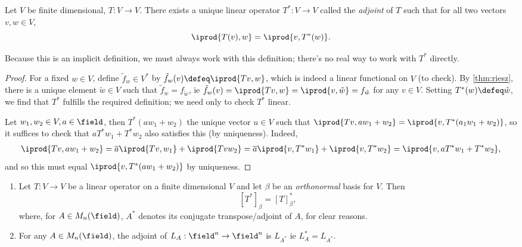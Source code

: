 \begin{theorem}[Adjoint]
    Let $V$ be finite dimensional, $T : V \to V$. There exists a unique linear operator $T^\ast : V \to V$ called the \emph{adjoint} of $T$ such that for all two vectors $v, w \in V$, \[
    \iprod{T(v), w} = \iprod{v, T^\ast(w)}.
    \]
\end{theorem}

\begin{remark}
    Because this is an implicit definition, we must always work with this definition; there's no real way to work with $T^\ast$ directly.
\end{remark}

\begin{proof}
    For a fixed $w \in V$, define $\tilde{f}_w \in V^\ast$ by $\tilde{f}_w(v) \defeq \iprod{Tv, w}$, which is indeed a linear functional on $V$ (to check). By \cref{thm:riesz}, there is a unique element $\tilde{w} \in V$ such that $\tilde{f}_w = f_{\tilde{w}}$, ie $\tilde{f}_w(v) = \iprod{Tv, w} = \iprod{v, \tilde{w}} = f_{\tilde{w}}$ for any $v \in V$. Setting $T^\ast(w) \defeq \tilde{w}$, we find that $T^\ast$ fulfills the required definition; we need only to check $T^\ast$ linear.

    Let $w_1, w_2 \in V, a \in \field$, then $T^\ast(aw_1 + w_2)$ the unique vector $u \in V$ such that $\iprod{Tv, aw_1 + w_2} = \iprod{v, T^\ast(a_1 w_1 + w_2)}$, so it suffices to check that $aT^\ast w_1 + T^\ast w_2$ also satisfies this (by uniqueness). Indeed, \begin{align*}
        \iprod{Tv, aw_1 + w_2} = \overline{a} \iprod{Tv, w_1} + \iprod{Tv w_2} = \overline{a} \iprod{v, T^\ast w_1} + \iprod{v, T^\ast w_2} = \iprod{v, aT^\ast w_1 + T^\ast w_2},
    \end{align*}
    and so this must equal $\iprod{v, T^\ast (aw_1 + w_2)}$ by uniqueness.
\end{proof}

\begin{proposition}
    \begin{enumerate}[label=(\alph*)]
        \item Let $T : V \to V$ be a linear operator on a finite dimensional $V$ and let $\beta$ be an \emph{orthonormal} basis for $V$. Then \[
        [T^\ast]_\beta = [T]_\beta^\ast,    
        \]
        where, for $A \in M_n(\field)$, $A^\ast$ denotes its conjugate transpose/adjoint of $A$, for clear reasons.
    \item For any $A \in M_n(\field)$, the adjoint of $L_A : \field^n \to \field^n$ is $L_{A^\ast}$ ie $L_A^\ast = L_{A^\ast}$.
    \end{enumerate}
\end{proposition}

